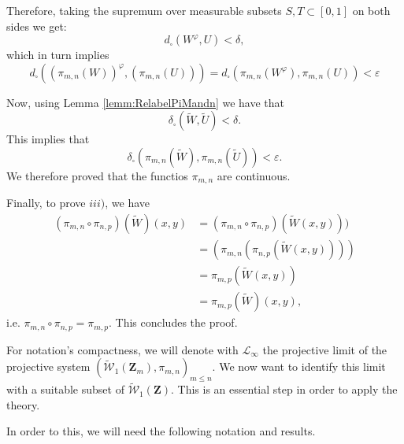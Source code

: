 \documentclass[12pt,twoside,a4paper]{article}
\newcommand{\Space}{\mathbf{Z}}
\newcommand{\UGraphon}{\widetilde{\mathcal{W}}_1}
\begin{document}
Therefore, taking the supremum over measurable subsets $S,T\subset[0,1]$ on both sides we get:
\begin{equation*}
    d_{\square}(W^{\varphi},U)< \delta,
\end{equation*}
which in turn implies
\begin{equation*}
    d_{\square}((\pi_{m,n}(W))^{\varphi},(\pi_{m,n}(U)))=d_{\square}(\pi_{m,n}(W^{\varphi}),\pi_{m,n}(U))<  \varepsilon
\end{equation*}

Now, using Lemma \ref{lemm:RelabelPiMandn} we have that
\begin{equation*}
    \delta_{\square}(\widetilde{W},\widetilde{U})<\delta. 
\end{equation*}
This implies that
\begin{equation*}
      \delta_{\square}(\pi_{m,n}(\widetilde{W}),\pi_{m,n}(\widetilde{U}))< \varepsilon.
\end{equation*}
We therefore proved that the functios $\pi_{m,n}$ are continuous. 

Finally, to prove $iii)$, we have
\begin{equation*}
\begin{aligned}
      (\pi_{m,n} \circ \pi_{n,p})(\widetilde{W})(x,y)&= (\pi_{m,n} \circ \pi_{n,p})(\widetilde{W}(x,y)))\\&=(\pi_{m,n} (\pi_{n,p}(\widetilde{W}(x,y))))\\&=\pi_{m,p}(\widetilde{W}(x,y))\\&=\pi_{m,p}(\widetilde{W})(x,y),
\end{aligned}
  \end{equation*}
i.e. $\pi_{m,n} \circ \pi_{n,p}=\pi_{m,p}$. This concludes the proof.
\endproof 



For notation's compactness, we will denote with $\mathcal{L}_{\infty}$ the projective limit of the projective system $(\UGraphon(\Space_m), \pi_{m,n})_{m \leq n}$. We now want to identify this limit with a suitable subset of $\UGraphon(\Space)$. This is an essential step in order to apply the theory. 

In order to this, we will need the following notation and results.
\end{document}
